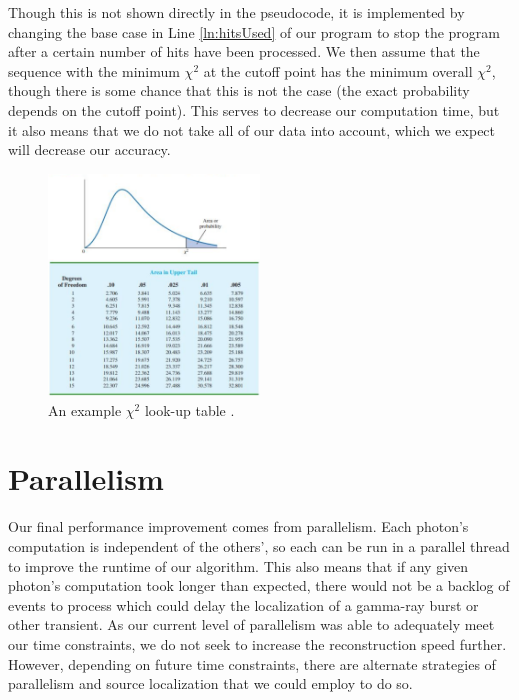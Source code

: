 \begin{enumerate}
    Though this is not shown directly in the pseudocode, it is implemented by changing the base case in Line \ref{ln:hitsUsed} of our program to stop the program after a certain number of hits have been processed. We then assume that the sequence with the minimum $\chi^2$ at the cutoff point has the minimum overall $\chi^2$, though there is some chance that this is not the case (the exact probability depends on the cutoff point). This serves to decrease our computation time, but it also means that we do not take all of our data into account, which we expect will decrease our accuracy.
\end{enumerate}

\begin{figure}
    \centering
    \includegraphics[width=0.5\textwidth]{chi2table.png}
    \caption{An example $\chi^2$ look-up table \cite{chitable}.}
    \label{fig:p-val}
\end{figure}

\section{Parallelism}
Our final performance improvement comes from parallelism. Each photon's computation is independent of the others', so each can be run in a parallel thread to improve the runtime of our algorithm. This also means that if any given photon's computation took longer than expected, there would not be a backlog of events to process which could delay the localization of a gamma-ray burst or other transient. As our current level of parallelism was able to adequately meet our time constraints, we do not seek to increase the reconstruction speed further. However, depending on future time constraints, there are alternate strategies of parallelism and source localization that we could employ to do so.